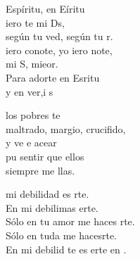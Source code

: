 \documentclass[12pt]{article}
\begin{document}
\begin{multicols*}{2}
\begin{cancion}%
	Espíritu, en Eíritu \\
	iero te mi Ds,\\
	según tu ved, según tu r.\\
	iero conote, yo iero note,\\
	mi S, mieor.\\
	Para adorte en Esritu \\
	y en ver,i s \\
\end{cancion}%

\begin{cancion}%
	 los pobres  te \\
	maltrado, margio, crucifido,\\
	y ve e acear\\
	pu sentir que ellos\\
	siempre  me llas. \\
\end{cancion}%

\begin{cancion}%
	 mi debilidad es rte.\\
	En mi debilimas erte.\\
	Sólo en tu amor me haces rte.\\
	Sólo en tuda me hacesrte.\\
	En mi debilid te es erte en . \\
\end{cancion}%


\end{multicols*}
\end{document}
